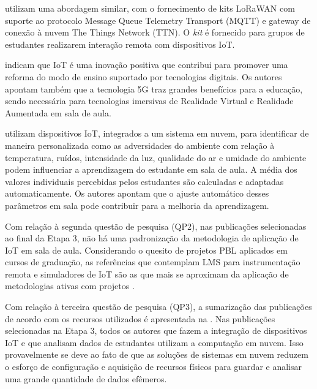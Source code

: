 \documentclass[portuguese]{textolivre}
\begin{document}
\textcite{debauche_internet_2018} utilizam uma abordagem similar, com o fornecimento de kits LoRaWAN com suporte ao protocolo Message Queue Telemetry Transport (MQTT) e gateway de conexão à nuvem The Things Network (TTN). O \textit{kit} é fornecido para grupos de estudantes realizarem interação remota com dispositivos IoT.

\textcite{lin_construction_2019} indicam que IoT é uma inovação positiva que contribui para promover uma reforma do modo de ensino suportado por tecnologias digitais. Os autores apontam também que a tecnologia 5G traz grandes benefícios para a educação, sendo necessária para tecnologias imersivas de Realidade Virtual e Realidade Aumentada em sala de aula. 

\textcite{burunkaya_design_2022} utilizam dispositivos IoT, integrados a um sistema em nuvem, para identificar de maneira personalizada como as adversidades do ambiente com relação à temperatura, ruídos, intensidade da luz, qualidade do ar e umidade do ambiente podem influenciar a aprendizagem do estudante em sala de aula. A média dos valores individuais percebidas pelos estudantes são calculadas e adaptadas automaticamente. Os autores apontam que o ajuste automático desses parâmetros em sala pode contribuir para a melhoria da aprendizagem.

Com relação à segunda questão de pesquisa (QP2), nas publicações selecionadas ao final da Etapa 3, não há uma padronização da metodologia de aplicação de IoT em sala de aula. Considerando o quesito de projetos PBL aplicados em cursos de graduação, as referências que contemplam LMS para instrumentação remota e simuladores de IoT são as que mais se aproximam da aplicação de metodologias ativas com projetos \cite{oteri_application_2020,fortoul-diaz_project-based_2021,hincapie_use_2020}. 

Com relação à terceira questão de pesquisa (QP3), a sumarização das publicações de acordo com os recursos utilizados é apresentada na . Nas publicações selecionadas na Etapa 3, todos os autores que fazem a integração de dispositivos IoT e que analisam dados de estudantes utilizam a computação em nuvem. Isso provavelmente se deve ao fato de que as soluções de sistemas em nuvem reduzem o esforço de configuração e aquisição de recursos físicos para guardar e analisar uma grande quantidade de dados efêmeros. 
\end{document}
